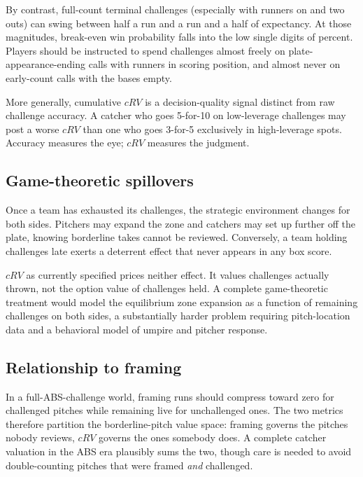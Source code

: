 By contrast, full-count terminal challenges (especially with runners on and
two outs) can swing between half a run and a run and a half of expectancy.
At those magnitudes, break-even win probability falls into the low single
digits of percent. Players should be instructed to spend challenges almost
freely on plate-appearance-ending calls with runners in scoring position, and
almost never on early-count calls with the bases empty.

More generally, cumulative $cRV$ is a decision-quality signal distinct from raw
challenge accuracy. A catcher who goes 5-for-10 on low-leverage challenges may
post a worse $cRV$ than one who goes 3-for-5 exclusively in high-leverage
spots. Accuracy measures the eye; $cRV$ measures the judgment.

\subsection{Game-theoretic spillovers}
Once a team has exhausted its challenges, the strategic environment changes for
both sides. Pitchers may expand the zone and catchers may set up further off
the plate, knowing borderline takes cannot be reviewed. Conversely, a team
holding challenges late exerts a deterrent effect that never appears in any
box score.

$cRV$ as currently specified prices neither effect. It values challenges
actually thrown, not the option value of challenges held. A complete
game-theoretic treatment would model the equilibrium zone expansion as a
function of remaining challenges on both sides, a substantially harder problem
requiring pitch-location data and a behavioral model of umpire and pitcher
response.

\subsection{Relationship to framing}
In a full-ABS-challenge world, framing runs should compress toward zero for
challenged pitches while remaining live for unchallenged ones. The two metrics
therefore partition the borderline-pitch value space: framing governs the
pitches nobody reviews, $cRV$ governs the ones somebody does. A complete
catcher valuation in the ABS era plausibly sums the two, though care is needed
to avoid double-counting pitches that were framed \emph{and} challenged.

